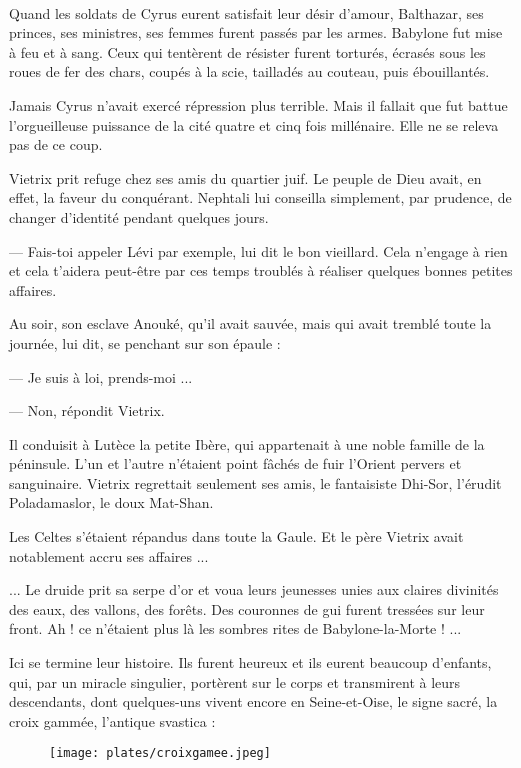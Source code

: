 \documentclass[a4paper, 11pt, oneside, polutonikogreek, french]{article}
\begin{document}
\paragraph{}
Quand les soldats de Cyrus eurent satisfait leur désir d'amour, Balthazar, ses princes, ses ministres, ses femmes furent passés par les armes. Babylone fut mise à feu et à sang. Ceux qui tentèrent de résister furent torturés, écrasés sous les roues de fer des chars, coupés à la scie, tailladés au couteau, puis ébouillantés.

Jamais Cyrus n'avait exercé répression plus terrible. Mais il fallait que fut battue l'orgueilleuse puissance de la cité quatre et cinq fois millénaire. Elle ne se releva pas de ce coup.

\bigskip
\centerline{\EightStarTaper}
\centerline{\EightStarTaper\EightStarTaper}
\bigskip

Vietrix prit refuge chez ses amis du quartier juif. Le peuple de Dieu avait, en effet, la faveur du conquérant. Nephtali lui conseilla simplement, par prudence, de changer d'identité pendant quelques jours.

--- Fais-toi appeler Lévi par exemple, lui dit le bon vieillard. Cela n'engage à rien et cela t'aidera peut-être par ces temps troublés à réaliser quelques bonnes petites affaires.

Au soir, son esclave Anouké, qu'il avait sauvée, mais qui avait tremblé toute la journée, lui dit, se penchant sur son épaule :

--- Je suis à loi, prends-moi ...

--- Non, répondit Vietrix.

\bigskip
\centerline{\EightStarTaper}
\centerline{\EightStarTaper\EightStarTaper}
\bigskip

Il conduisit à Lutèce la petite Ibère, qui appartenait à une noble famille de la péninsule. L'un et l'autre n'étaient point fâchés de fuir l'Orient pervers et sanguinaire. Vietrix regrettait seulement ses amis, le fantaisiste Dhi-Sor, l'érudit Poladamaslor, le doux Mat-Shan.

Les Celtes s'étaient répandus dans toute la Gaule. Et le père Vietrix avait notablement accru ses affaires ...

\bigskip
\centerline{\EightStarTaper}
\centerline{\EightStarTaper\EightStarTaper}
\bigskip

... Le druide prit sa serpe d'or et voua leurs jeunesses unies aux claires divinités des eaux, des vallons, des forêts. Des couronnes de gui furent tressées sur leur front. Ah ! ce n'étaient plus là les sombres rites de Babylone-la-Morte ! ...

\bigskip
\centerline{\EightStarTaper}
\centerline{\EightStarTaper\EightStarTaper}
\bigskip

Ici se termine leur histoire. Ils furent heureux et ils eurent beaucoup d'enfants, qui, par un miracle singulier, portèrent sur le corps et transmirent à leurs descendants, dont quelques-uns vivent encore en Seine-et-Oise, le signe sacré, la croix gammée, l'antique svastica :

\begin{figure}[H]
\centering
\texttt{[image: plates/croixgamee.jpeg]}
\end{figure}
\clearpage
\end{document}
